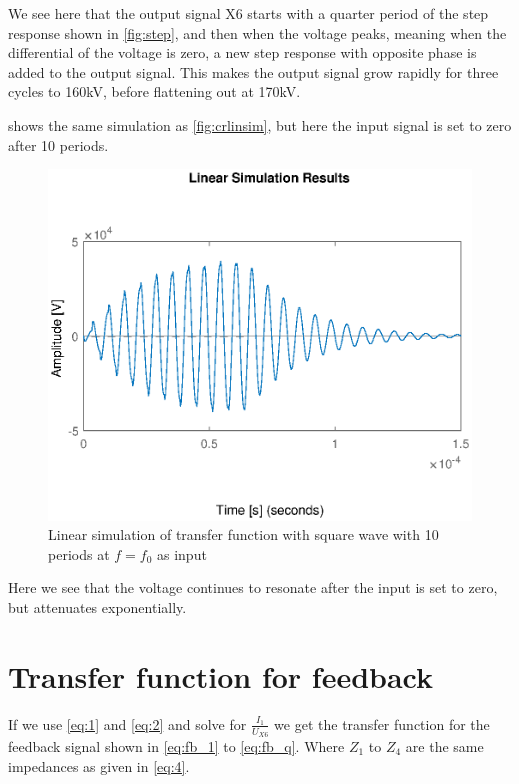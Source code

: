 We see here that the output signal X6 starts with a quarter period of the step response shown in \cref{fig:step}, and then when the voltage peaks, meaning when the differential of the voltage is zero, a new step response with opposite phase is added to the output signal. This makes the output signal grow rapidly for three cycles to 160kV, before flattening out at 170kV.

 shows the same simulation as \cref{fig:crlinsim}, but here the input signal is set to zero after 10 periods.

\begin{figure}
    \centering
    \includegraphics[width=\textwidth]{img/Linsim_10T.eps}
    \caption{Linear simulation of transfer function with square wave with 10 periods at $f=f_0$ as input}
    \label{fig:crlinsim10T}
\end{figure}

Here we see that the voltage continues to resonate after the input is set to zero, but attenuates exponentially.

\newpage
\section{Transfer function for feedback}
\label{sec:mod_fb}
If we use \cref{eq:1} and \cref{eq:2} and solve for $\frac{I_1}{U_{X6}}$ we get the transfer function for the feedback signal shown in \cref{eq:fb_1} to \cref{eq:fb_q}. Where $Z_1$ to $Z_4$ are the same impedances as given in \cref{eq:4}.

